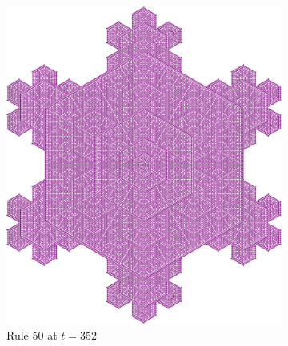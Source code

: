 \documentclass{article}
\begin{document}
\begin{figure}[H]
    \centering
    \begin{subfigure}[b]{0.68\textwidth}
        \centering
        \includegraphics[width=\textwidth]{graphics/behavior/fractals/rule-50-time-352-OneAlive.pdf}
        \caption{Rule 50 at $t=352$}
        \label{fig:rule-50-time-352-OneAlive}
    \end{subfigure}
    \break
    \begin{subfigure}[b]{0.46\textwidth}
        \centering

\end{subfigure}
\end{figure}
\end{document}
